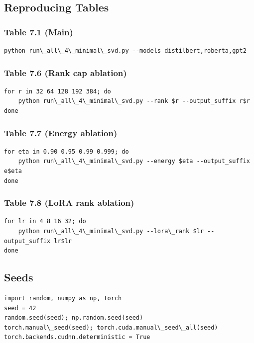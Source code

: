 \subsection{Reproducing Tables}

\subsubsection{Table 7.1 (Main)}
\begin{lstlisting}
python run\_all\_4\_minimal\_svd.py --models distilbert,roberta,gpt2
\end{lstlisting}

\subsubsection{Table 7.6 (Rank cap ablation)}
\begin{lstlisting}
for r in 32 64 128 192 384; do
    python run\_all\_4\_minimal\_svd.py --rank $r --output_suffix r$r
done
\end{lstlisting}

\subsubsection{Table 7.7 (Energy ablation)}
\begin{lstlisting}
for eta in 0.90 0.95 0.99 0.999; do
    python run\_all\_4\_minimal\_svd.py --energy $eta --output_suffix e$eta
done
\end{lstlisting}

\subsubsection{Table 7.8 (LoRA rank ablation)}
\begin{lstlisting}
for lr in 4 8 16 32; do
    python run\_all\_4\_minimal\_svd.py --lora\_rank $lr --output_suffix lr$lr
done
\end{lstlisting}

\subsection{Seeds}

\begin{lstlisting}
import random, numpy as np, torch
seed = 42
random.seed(seed); np.random.seed(seed)
torch.manual\_seed(seed); torch.cuda.manual\_seed\_all(seed)
torch.backends.cudnn.deterministic = True
\end{lstlisting}

